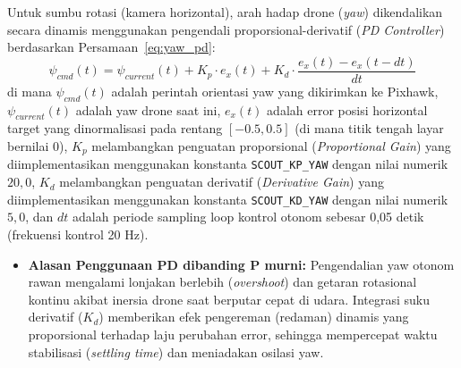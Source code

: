 Untuk sumbu rotasi (kamera horizontal), arah hadap drone (\textit{yaw}) dikendalikan secara dinamis menggunakan pengendali proporsional-derivatif (\textit{PD Controller}) berdasarkan Persamaan~\ref{eq:yaw_pd}:
\begin{equation}
	\label{eq:yaw_pd}
	\psi_{cmd}(t) = \psi_{current}(t) + K_p \cdot e_x(t) + K_d \cdot \frac{e_x(t) - e_x(t-dt)}{dt}
\end{equation}
di mana $\psi_{cmd}(t)$ adalah perintah orientasi yaw yang dikirimkan ke Pixhawk, $\psi_{current}(t)$ adalah yaw drone saat ini, $e_x(t)$ adalah error posisi horizontal target yang dinormalisasi pada rentang $[-0.5, 0.5]$ (di mana titik tengah layar bernilai 0), $K_p$ melambangkan penguatan proporsional (\textit{Proportional Gain}) yang diimplementasikan menggunakan konstanta \texttt{SCOUT\_KP\_YAW} dengan nilai numerik $20,0$, $K_d$ melambangkan penguatan derivatif (\textit{Derivative Gain}) yang diimplementasikan menggunakan konstanta \texttt{SCOUT\_KD\_YAW} dengan nilai numerik $5,0$, dan $dt$ adalah periode sampling loop kontrol otonom sebesar 0,05 detik (frekuensi kontrol 20 Hz).
\begin{itemize}
	\item \textbf{Alasan Penggunaan PD dibanding P murni:} Pengendalian yaw otonom rawan mengalami lonjakan berlebih (\textit{overshoot}) dan getaran rotasional kontinu akibat inersia drone saat berputar cepat di udara. Integrasi suku derivatif ($K_d$) memberikan efek pengereman (redaman) dinamis yang proporsional terhadap laju perubahan error, sehingga mempercepat waktu stabilisasi (\textit{settling time}) dan meniadakan osilasi yaw.
\end{itemize}

